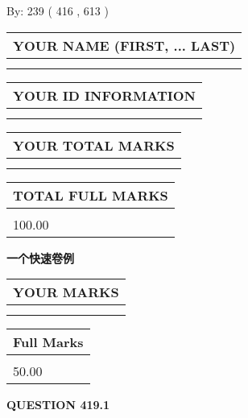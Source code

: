 \documentclass{ctexart}
\begin{document}
   
\hspace{1.0in} By: 
 239 ( 416 ,  613 )
   
   
   
   
\newpage 
\setcounter{page}{ 
   419001 } 
   
   
   
   
\noindent\begin{tabular}{|l|}
\hline
YOUR NAME (FIRST, ... LAST)  \\
\hline
 \\ 
 \\ 
\hline
\end{tabular}
\hspace{0.05in} \begin{tabular}{|l|}
\hline
 YOUR   ID   INFORMATION  \\
\hline
 \\ 
 \\ 
\hline
\end{tabular}
   
   
\vspace{0.2in}\noindent\begin{tabular}{|l|}
\hline
YOUR TOTAL MARKS  \\
\hline
 \\ 
 \\ 
\hline
\end{tabular}
\hspace{0.05in} \begin{tabular}{|l|}
\hline
TOTAL FULL MARKS  \\
\hline
 \\ 
100.00 \\
\hline
\end{tabular}
   
   
 \vspace{0.2in}
{\LARGE {\textbf{ 一个快速卷例}}}
   
   
  
\vspace{0.2in}
  
\noindent\begin{tabular}{|l|}
\hline
 YOUR MARKS  \\
\hline
 \\ 
 \\ 
\hline
\end{tabular}
\hspace{0.05in} \begin{tabular}{|l|}
\hline
 Full Marks  \\
\hline
 \\ 
50.00 \\
\hline
\end{tabular}
{\textbf{\Large{QUESTION
419.1 
}}}
  
\end{document}
